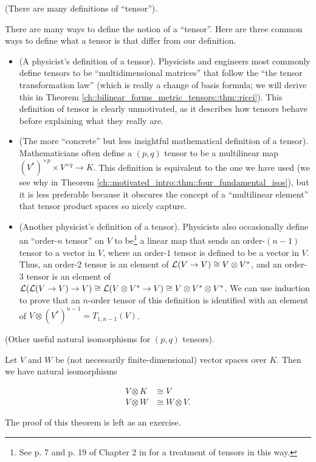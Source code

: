 \begin{remark}
\label{ch::motivated_intro::rmk::many_defs_tensor}
    (There are many definitions of ``tensor'').
    
    There are many ways to define the notion of a ``tensor''. Here are three common ways to define what a tensor is that differ from our definition.
    
    \begin{itemize}
        \item (A physicist's definition of a tensor). Physicists and engineers most commonly define tensors to be ``multidimensional matrices'' that follow the ``the tensor transformation law'' (which is really a change of basis formula; we will derive this in Theorem \ref{ch::bilinear_forms_metric_tensors::thm::ricci}). This definition of tensor is clearly unmotivated, as it describes how tensors behave before explaining what they really are.
        \item (The more ``concrete'' but less insightful mathematical definition of a tensor). Mathematicians often define a $(p, q)$ tensor to be a multilinear map $(V^*)^{\times p} \times V^{\times q} \rightarrow K$. This definition is equivalent to the one we have used (we see why in Theorem \ref{ch::motivated_intro::thm::four_fundamental_isos}), but it is less preferable because it obscures the concept of a ``multilinear element'' that tensor product spaces so nicely capture.
        \item (Another physicist's definition of a tensor). Physicists also occasionally define an ``order-$n$ tensor'' on $V$ to be\footnote{See p. 7 and p. 19 of Chapter 2 in \cite{BonetWood} for a treatment of tensors in this way.} a linear map that sends an order-$(n - 1)$ tensor to a vector in $V$, where an order-$1$ tensor is defined to be a vector in $V$. Thus, an order-$2$ tensor is an element of $\mathcal{L}(V \rightarrow V) \cong V \otimes V^*$, and an order-$3$ tensor is an element of $\mathcal{L}(\mathcal{L}(V \rightarrow V) \rightarrow V) \cong \mathcal{L}(V \otimes V^* \rightarrow V) \cong V \otimes V^* \otimes V^*$. We can use induction to prove that an $n$-order tensor of this definition is identified with an element of $V \otimes (V^{*})^{n - 1} = T_{1, n - 1}(V)$.
    \end{itemize}
\end{remark}

\begin{theorem}
    (Other useful natural isomorphisms for $(p, q)$ tensors).

    Let $V$ and $W$ be (not necessarily finite-dimensional) vector spaces over $K$. Then we have natural isomorphisms

     \begin{align*}
         V \otimes K &\cong V \\
         V \otimes W &\cong W \otimes V.
     \end{align*}
     
     The proof of this theorem is left as an exercise.
\end{theorem}
